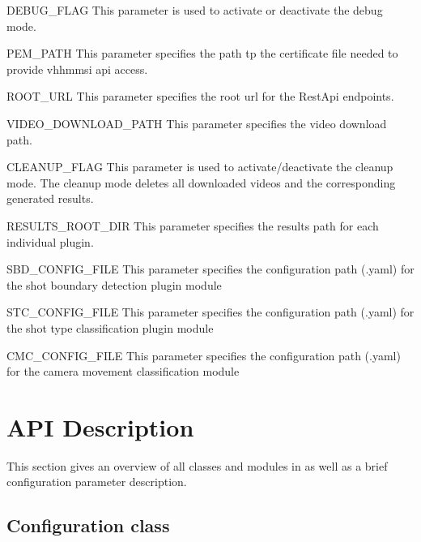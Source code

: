 \documentclass[letterpaper,10pt,english,openany,oneside]{sphinxmanual}
\begin{document}
DEBUG\_FLAG
This parameter is used to activate or deactivate the debug mode.



PEM\_PATH
This parameter specifies the path tp the certificate file needed to provide vhh\sphinxhyphen{}mmsi api access.



ROOT\_URL
This parameter specifies the root url for the RestApi endpoints.



VIDEO\_DOWNLOAD\_PATH
This parameter specifies the video download path.



CLEANUP\_FLAG
This parameter is used to activate/deactivate the clean\sphinxhyphen{}up mode. The clean\sphinxhyphen{}up mode deletes all downloaded videos and the corresponding generated results.



RESULTS\_ROOT\_DIR
This parameter specifies the results path for each individual plugin.



SBD\_CONFIG\_FILE
This parameter specifies the configuration path (.yaml) for the shot boundary detection plugin module



STC\_CONFIG\_FILE
This parameter specifies the configuration path (.yaml) for the shot type classification plugin module



CMC\_CONFIG\_FILE
This parameter specifies the configuration path (.yaml) for the camera movement classification module




\chapter{API Description}
\label{\detokenize{index:api-description}}
This section gives an overview of all classes and modules in  as well as a brief configuration parameter description.


\section{Configuration class}
\label{\detokenize{Configuration:configuration-class}}\label{\detokenize{Configuration::doc}}
\end{document}
